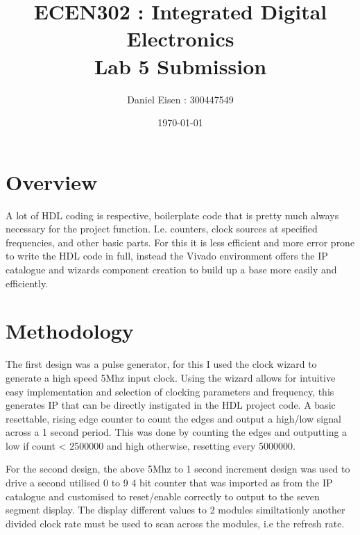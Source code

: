 \documentclass[11pt]{article}
\title{ECEN302 : Integrated Digital Electronics \\ Lab 5 Submission}
\author{Daniel Eisen : 300447549}
\date{\today}
\begin{document}
\begin{preview}
\maketitle
\section{Overview}
A lot of HDL coding is respective, boilerplate code that is pretty much always necessary for the project function. I.e. counters, clock sources at specified frequencies, and other basic parts. For this it is less efficient and more error prone to write the HDL code in full, instead the Vivado environment offers the IP catalogue and wizards component creation to build up a base more easily and efficiently.


\section{Methodology}
The first design was a pulse generator, for this I used the clock wizard to generate a high speed 5Mhz input clock. Using the wizard allows for intuitive easy implementation and selection of clocking parameters and frequency, this generates IP that can be directly instigated in the HDL project code. 
A basic resettable, rising edge counter to count the edges and output a high/low signal across a 1 second period. This was done by counting the edges and outputting a low if count < 2500000 and high otherwise, resetting every 5000000.


For the second design, the above 5Mhz to 1 second increment design was used to drive a second utilised 0 to 9 4 bit counter that was imported as from the IP catalogue and customised to reset/enable correctly to output to the seven segment display. The display different values to 2 modules similtationly another divided clock rate must be used to scan across the modules, i.e the refresh rate.

\end{preview}
\end{document}
